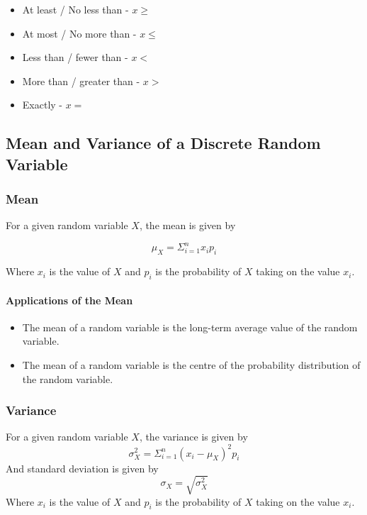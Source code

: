 \documentclass[12pt letter]{report}
\begin{document}
\begin{itemize}
	\item At least / No less than - $ x \geq$
	\item At most / No more than - $x \leq$
	\item Less than / fewer than - $ x <$
	\item  More than / greater than - $ x >$
	\item Exactly - $ x =$
\end{itemize}

\subsection{Mean and Variance of a Discrete Random Variable}

\subsubsection{Mean}


For a given random variable $X$, the mean is given by

\[
	\mu_{X} = \Sigma_{i=1}^{n} x_i p_i
\]

Where $x_i$ is the value of $X$ and $p_i$ is the probability of $X$ taking on the value $x_i$.


\paragraph{Applications of the Mean}

\begin{itemize}
	\item The mean of a random variable is the long-term average value of the random variable.
	\item The mean of a random variable is the centre of the probability distribution of the random variable.
\end{itemize}

\subsubsection{Variance}


For a given random variable $X$, the variance is given by
\[
	\sigma_{X}^2 = \Sigma_{i=1}^{n} \left( x_i - \mu_{X} \right)^2 p_i
\]
And standard deviation is given by
\[
	\sigma_{X} = \sqrt{\sigma_{X} ^2}
\]
Where $x_i$ is the value of $X$ and $p_i$ is the probability of $X$ taking on the value $x_i$.
\end{document}
